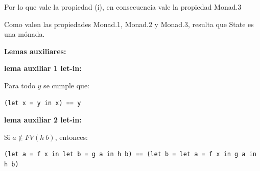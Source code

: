\begin{flushleft}
Por lo que vale la propiedad (i), en consecuencia vale la propiedad Monad.3\emptyline

Como valen las propiedades Monad.1, Monad.2 y Monad.3, resulta que State es una mónada.\emptyline\emptyline

{\Large{\textbf{Lemas auxiliares:}}}\emptyline

  \hspace{5mm}\textbf{lema auxiliar 1 let-in:}

  \hspace{5mm} Para todo $y$ se cumple que:

  \begin{center}
    \begin{lstlisting}[style=haskellStyle]
      (let x = y in x) == y 
    \end{lstlisting}
  \end{center}

  \hspace{5mm}\textbf{lema auxiliar 2 let-in:}

  \hspace{5mm} 
  Si $a\not\in FV(h\ b)$, entonces:

  \begin{center}
    \begin{lstlisting}[style=haskellStyle]
      (let a = f x in let b = g a in h b) == (let b = let a = f x in g a in h b)
    \end{lstlisting}
  \end{center}

\newpage

\end{flushleft}

